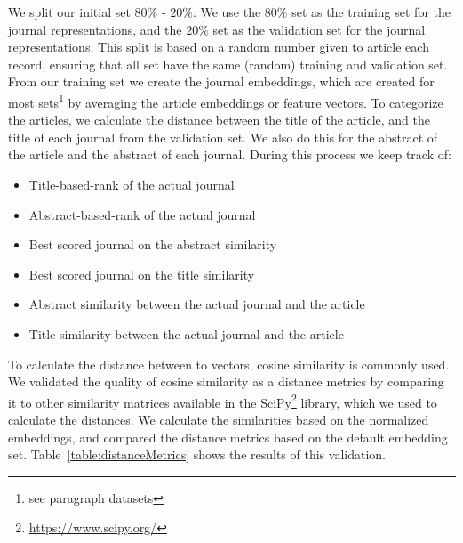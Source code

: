 \documentclass[../../Thesis.tex]{subfiles}
\begin{document}
We split our initial set  $80\%$ - $20\%$. We use the $80\%$ set as the training set for the journal representations, and the $20\%$ set as the validation set for the journal representations. This split is based on a random number given to article each record, ensuring that all set have the same (random) training and validation set.
From our training set we create the journal embeddings, which are created for most sets\footnote{see paragraph datasets} by averaging the article embeddings or feature vectors.
To categorize the articles, we calculate the distance between the title of the article, and the title of each journal from the validation set. We also do this for the abstract of the article and the abstract of each journal. During this process we keep track of:
\begin{itemize}
\item{Title-based-rank of the actual journal}
\item{Abstract-based-rank of the actual journal}
\item{Best scored journal on the abstract similarity}
\item{Best scored journal on the title similarity}
\item{Abstract similarity between the actual journal and the article}
\item{Title similarity between the actual journal and the article}
\end{itemize}
To calculate the distance between to vectors, cosine similarity is commonly used. We validated the quality of cosine similarity as a distance metrics by comparing it to other similarity matrices available in the SciPy\footnote{\url{https://www.scipy.org/}} library, which we used to calculate the distances. We calculate the similarities based on the normalized embeddings, and compared the distance metrics based on the default embedding set. Table~\ref{table:distanceMetrics} shows the results of this validation.\\
\end{document}
